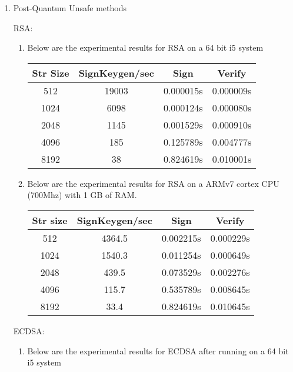 \documentclass[conference]{IEEEtran}
\begin{document}
\begin{enumerate}

\item {Post-Quantum Unsafe methods}

RSA:
\begin{enumerate}
\item{Below are the experimental results for RSA  on a 64 bit i5 system}

\begin{center}
\small
\begin{tabular}{||c c c c||} 
\hline
Str Size & SignKeygen/sec & Sign & Verify \\ [0.5ex] 
\hline\hline
512 & 19003 &  0.000015s & 0.000009s\\ 
\hline
1024 & 6098 &0.000124s & 0.000080s\\
\hline
2048 & 1145 & 0.001529s & 0.000910s\\
\hline
4096 & 185 & 0.125789s & 0.004777s \\
\hline
8192 & 38 & 0.824619s & 0.010001s\\
\hline
\end{tabular}
\end{center}

\item{ Below are the experimental results for RSA  on a ARMv7 cortex CPU (700Mhz) with 1 GB of RAM.}
\begin{center}
\small
\begin{tabular}{||c c c c||} 
\hline
Str size & SignKeygen/sec & Sign & Verify \\ [0.5ex] 
\hline\hline
512 & 4364.5 &  0.002215s & 0.000229s\\ 
\hline
1024 & 1540.3 &0.011254s & 0.000649s\\
\hline
2048 & 439.5 & 0.073529s & 0.002276s\\
\hline
4096 & 115.7 & 0.535789s & 0.008645s \\
\hline
8192 & 33.4 & 0.824619s & 0.010645s\\
\hline
\end{tabular}
\end{center}

\end{enumerate}

ECDSA:
\begin{enumerate}

\item{Below are the experimental results for ECDSA after running  on a 64 bit i5 system}


\end{enumerate}
\end{enumerate}
\end{document}
